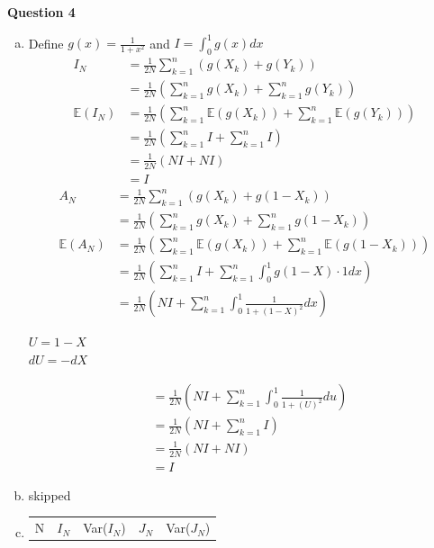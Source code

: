 \documentclass[12pt, letterpaper]{article}
\begin{document}
\newpage
\noindent \textbf{Question 4}
\begin{enumerate}[a.]
    \item Define $g(x) = \frac{1}{1+x^2}$ and $I = \int_{0}^{1}g(x)dx$
    \begin{align*}
        I_N &= \frac 1{2N} \sum_{k=1}^{n} (g(X_k) + g(Y_k)) \\
        &= \frac 1{2N} \left(\sum_{k=1}^{n}g(X_k) + \sum_{k=1}^{n}g(Y_k)\right) \\
        \mathbb{E}(I_N) &= \frac 1{2N} \left(\sum_{k=1}^{n}\mathbb{E}(g(X_k)) + \sum_{k=1}^{n}\mathbb{E}(g(Y_k))\right) \\
        &= \frac 1{2N} \left(\sum_{k=1}^{n}I + \sum_{k=1}^{n}I\right) \\
        &= \frac 1{2N}(NI+NI) \\
        &= I
    \end{align*}
    \begin{align*}
        A_N &= \frac 1{2N} \sum_{k=1}^{n} (g(X_k) + g(1-X_k)) \\
        &= \frac 1{2N} \left(\sum_{k=1}^{n}g(X_k) + \sum_{k=1}^{n}g(1-X_k)\right) \\
        \mathbb{E}(A_N)&=\frac 1{2N} \left(\sum_{k=1}^{n}\mathbb{E}(g(X_k)) + \sum_{k=1}^{n}\mathbb{E}(g(1-X_k))\right) \\
        &= \frac 1{2N} \left( \sum_{k=1}^{n} I + \sum_{k=1}^{n} \int_{0}^{1} g(1-X)\cdot 1 dx \right) \\
        &= \frac 1{2N} \left( NI + \sum_{k=1}^{n} \int_{0}^{1} \frac{1}{1+(1-X)^2} dx \right)
    \end{align*}
    \begin{center}
        $U = 1-X$ \\
        $dU = -dX$
    \end{center}
    \newpage
    \begin{align*}
        & = \frac 1{2N} \left( NI + \sum_{k=1}^{n} \int_{0}^{1} \frac{1}{1+(U)^2} du \right) \\
        & = \frac 1{2N} \left( NI + \sum_{k=1}^{n} I \right)\\
        & = \frac 1{2N} (NI + NI) \\
        & = I
    \end{align*}
    \item skipped
    \item \quad
    \begin{center}
    \begin{tabular}{c | c c | c c}
        N & $I_N$ & Var($I_N$) & $J_N$ & Var($J_N$) \\

\end{tabular}
\end{center}
\end{enumerate}
\end{document}

